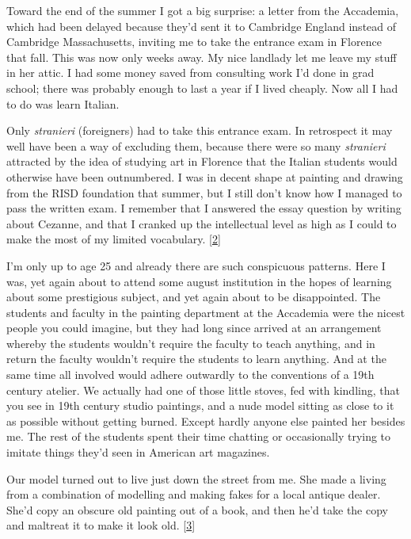 Toward the end of the summer I got a big surprise: a letter from the
Accademia, which had been delayed because they'd sent it to Cambridge
England instead of Cambridge Massachusetts, inviting me to take the
entrance exam in Florence that fall. This was now only weeks away. My
nice landlady let me leave my stuff in her attic. I had some money saved
from consulting work I'd done in grad school; there was probably enough
to last a year if I lived cheaply. Now all I had to do was learn
Italian.

Only \emph{stranieri} (foreigners) had to take this entrance exam. In
retrospect it may well have been a way of excluding them, because there
were so many \emph{stranieri} attracted by the idea of studying art in
Florence that the Italian students would otherwise have been
outnumbered. I was in decent shape at painting and drawing from the RISD
foundation that summer, but I still don't know how I managed to pass the
written exam. I remember that I answered the essay question by writing
about Cezanne, and that I cranked up the intellectual level as high as I
could to make the most of my limited vocabulary. {[}\hyperref[f2n]{2}{]}

I'm only up to age 25 and already there are such conspicuous patterns.
Here I was, yet again about to attend some august institution in the
hopes of learning about some prestigious subject, and yet again about to
be disappointed. The students and faculty in the painting department at
the Accademia were the nicest people you could imagine, but they had
long since arrived at an arrangement whereby the students wouldn't
require the faculty to teach anything, and in return the faculty
wouldn't require the students to learn anything. And at the same time
all involved would adhere outwardly to the conventions of a 19th century
atelier. We actually had one of those little stoves, fed with kindling,
that you see in 19th century studio paintings, and a nude model sitting
as close to it as possible without getting burned. Except hardly anyone
else painted her besides me. The rest of the students spent their time
chatting or occasionally trying to imitate things they'd seen in
American art magazines.

Our model turned out to live just down the street from me. She made a
living from a combination of modelling and making fakes for a local
antique dealer. She'd copy an obscure old painting out of a book, and
then he'd take the copy and maltreat it to make it look old.
{[}\hyperref[f3n]{3}{]}

